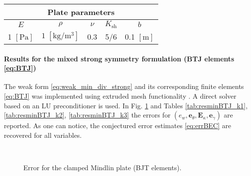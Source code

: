 \begin{table}[htbp]
	\centering
	\begin{tabular}{ccccc}
		\hline 
		\multicolumn{5}{c}{Plate parameters} \\ 
		\hline 
		$E$ & $\rho$ & $\nu$ & $K_{\text{sh}}$ & $b$ \\
		1 $[\textrm{Pa}]$ & $1\; [\textrm{kg}/\textrm{m}^3]$ & 0.3 & 5/6 & 0.1 $[\textrm{m}]$\\ 
		\hline 
	\end{tabular} 
	\captionsetup{width=0.95\linewidth}
	\vspace{1mm}
	\label{tab:parMin}
\end{table}

\paragraph{Results for the mixed strong symmetry formulation (BTJ elements \eqref{eq:BTJ})} 

The weak form \eqref{eq:weak_min_div_strong} and its corresponding finite elements \eqref{eq:BTJ} was implemented using {} extruded mesh functionality \cite{mcrae2016}. A direct solver based on an LU preconditioner is used. In Fig. \ref{fig:errorBTJ} and Tables \ref{tab:resminBTJ_k1}, \ref{tab:resminBTJ_k2}, \ref{tab:resminBTJ_k3} the errors for $(e_w, \bm{e}_\theta, \bm{E}_\kappa, \bm{e}_\gamma)$ are reported. As one can notice, the conjectured error estimates \eqref{eq:errBEC} are recovered for all variables. 

\begin{figure}[htbp]%
	\centering
	\hspace{8pt}%
	 \\
	\hspace{8pt}%
	\caption{Error for the clamped Mindlin plate (BJT elements).}%
	\label{fig:errorBTJ}%
\end{figure}


